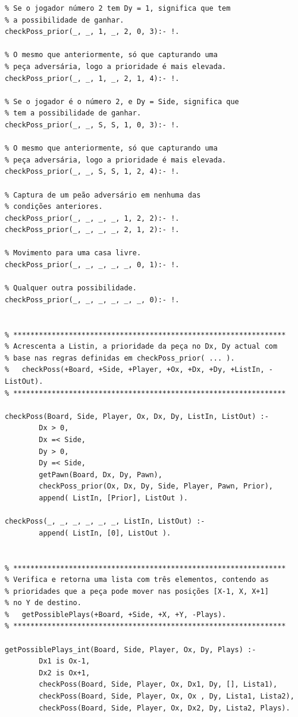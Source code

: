 \documentclass[15pt,a4paper]{article}
\begin{document}
\begin{lstlisting}
% Se o jogador número 2 tem Dy = 1, significa que tem
% a possibilidade de ganhar.
checkPoss_prior(_, _, 1, _, 2, 0, 3):- !.

% O mesmo que anteriormente, só que capturando uma
% peça adversária, logo a prioridade é mais elevada.
checkPoss_prior(_, _, 1, _, 2, 1, 4):- !.

% Se o jogador é o número 2, e Dy = Side, significa que
% tem a possibilidade de ganhar.
checkPoss_prior(_, _, S, S, 1, 0, 3):- !.

% O mesmo que anteriormente, só que capturando uma
% peça adversária, logo a prioridade é mais elevada.
checkPoss_prior(_, _, S, S, 1, 2, 4):- !.

% Captura de um peão adversário em nenhuma das
% condições anteriores.
checkPoss_prior(_, _, _, _, 1, 2, 2):- !.
checkPoss_prior(_, _, _, _, 2, 1, 2):- !.

% Movimento para uma casa livre.
checkPoss_prior(_, _, _, _, _, 0, 1):- !.

% Qualquer outra possibilidade.
checkPoss_prior(_, _, _, _, _, _, 0):- !.


% ****************************************************************
% Acrescenta a Listin, a prioridade da peça no Dx, Dy actual com
% base nas regras definidas em checkPoss_prior( ... ).
%	checkPoss(+Board, +Side, +Player, +Ox, +Dx, +Dy, +ListIn, -ListOut).
% ****************************************************************      

checkPoss(Board, Side, Player, Ox, Dx, Dy, ListIn, ListOut) :-
		Dx > 0,
		Dx =< Side,
		Dy > 0,
		Dy =< Side,
		getPawn(Board, Dx, Dy, Pawn),
		checkPoss_prior(Ox, Dx, Dy, Side, Player, Pawn, Prior),
		append( ListIn, [Prior], ListOut ).
		
checkPoss(_, _, _, _, _, _, ListIn, ListOut) :-
		append( ListIn, [0], ListOut ).
		

% ****************************************************************
% Verifica e retorna uma lista com três elementos, contendo as
% prioridades que a peça pode mover nas posições [X-1, X, X+1]
% no Y de destino.
%	getPossiblePlays(+Board, +Side, +X, +Y, -Plays).
% ****************************************************************   
		
getPossiblePlays_int(Board, Side, Player, Ox, Dy, Plays) :-
		Dx1 is Ox-1,
		Dx2 is Ox+1,
		checkPoss(Board, Side, Player, Ox, Dx1, Dy, [], Lista1),
		checkPoss(Board, Side, Player, Ox, Ox , Dy, Lista1, Lista2),
		checkPoss(Board, Side, Player, Ox, Dx2, Dy, Lista2, Plays).


\end{lstlisting}
\end{document}
